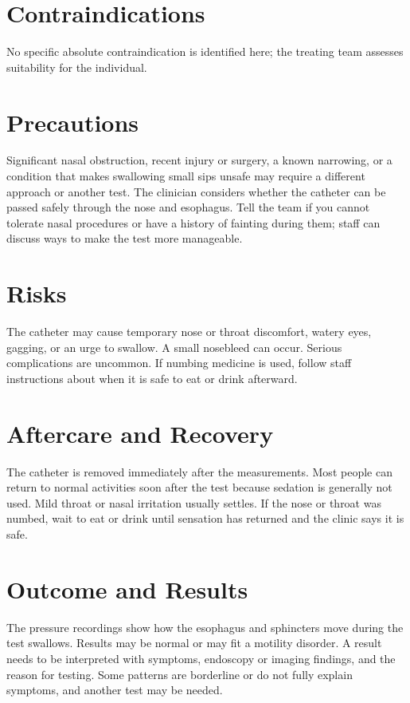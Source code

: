 \section*{Contraindications}
No specific absolute contraindication is identified here; the treating team assesses suitability for the individual.

\section*{Precautions}
Significant nasal obstruction, recent injury or surgery, a known narrowing, or a condition that makes swallowing small sips unsafe may require a different approach or another test. The clinician considers whether the catheter can be passed safely through the nose and esophagus. Tell the team if you cannot tolerate nasal procedures or have a history of fainting during them; staff can discuss ways to make the test more manageable.

\section*{Risks}
The catheter may cause temporary nose or throat discomfort, watery eyes, gagging, or an urge to swallow. A small nosebleed can occur. Serious complications are uncommon. If numbing medicine is used, follow staff instructions about when it is safe to eat or drink afterward.

\section*{Aftercare and Recovery}
The catheter is removed immediately after the measurements. Most people can return to normal activities soon after the test because sedation is generally not used. Mild throat or nasal irritation usually settles. If the nose or throat was numbed, wait to eat or drink until sensation has returned and the clinic says it is safe.

\section*{Outcome and Results}
The pressure recordings show how the esophagus and sphincters move during the test swallows. Results may be normal or may fit a motility disorder. A result needs to be interpreted with symptoms, endoscopy or imaging findings, and the reason for testing. Some patterns are borderline or do not fully explain symptoms, and another test may be needed.

